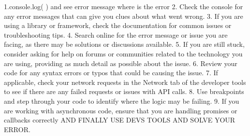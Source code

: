  1.console.log( ) and see error message where is the error
 2. Check the console for any error messages that can give you clues about what went wrong.
 3. If you are using a library or framework, check the documentation for common issues or troubleshooting tips.
 4. Search online for the error message or issue you are facing, as there may be solutions or discussions available. 
 5. If you are still stuck, consider asking for help on forums or communities related to the technology you are using, providing as much detail as possible about the issue.
 6. Review your code for any syntax errors or typos that could be causing the issue.
 7. If applicable, check your network requests in the Network tab of the developer tools to see if there are any failed requests or issues with API calls.
 8. Use breakpoints and step through your code to identify where the logic may be failing.   
9. If you are working with asynchronous code, ensure that you are handling promises or callbacks correctly
AND FINALLY USE DEVS TOOLS AND SOLVE YOUR ERROR.